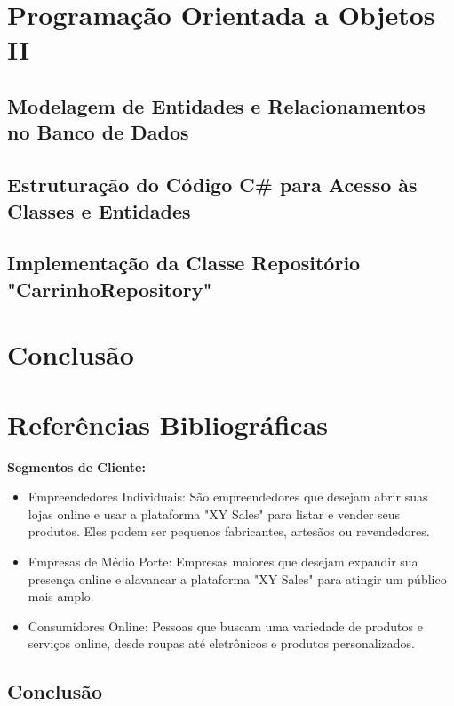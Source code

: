 \documentclass[
	12pt,				%
	openright,			%
	twoside,			%
	a4paper,			%
	english,			%
	brazil				%
	]{abntex2}
\begin{document}
\chapter{Programação Orientada a Objetos II}\label{cap_program_orientada_a_objetos}

\section{Modelagem de Entidades e Relacionamentos no Banco de Dados}

\section{Estruturação do Código C# para Acesso às Classes e Entidades}

\section{Implementação da Classe Repositório "CarrinhoRepository"}

\chapter{Conclusão}\label{cap_conclusao}

\chapter{Referências Bibliográficas}\label{cap_referencias}

\textbf{Segmentos de Cliente:}
\begin{itemize}
    \item Empreendedores Individuais: São empreendedores que desejam abrir suas lojas online e usar a plataforma "XY Sales" para listar e vender seus produtos. Eles podem ser pequenos fabricantes, artesãos ou revendedores.
    \item Empresas de Médio Porte: Empresas maiores que desejam expandir sua presença online e alavancar a plataforma "XY Sales" para atingir um público mais amplo.
    \item Consumidores Online: Pessoas que buscam uma variedade de produtos e serviços online, desde roupas até eletrônicos e produtos personalizados.
\end{itemize}

\section{Conclusão}
\end{document}
